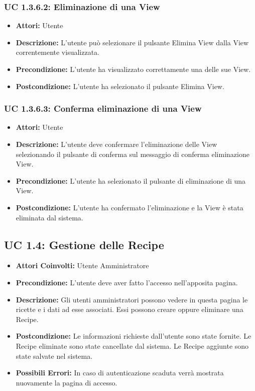 \subsubsection{UC 1.3.6.2: Eliminazione di una View}

\begin{itemize}
\item \textbf{Attori:} Utente
\item \textbf{Descrizione:} L'utente può selezionare il pulsante Elimina View dalla View correntemente visualizzata.
\item \textbf{Precondizione:} L'utente ha visualizzato correttamente una delle sue View.
\item \textbf{Postcondizione:} L'utente ha selezionato il pulsante Elimina View.
\end{itemize}

\subsubsection{UC 1.3.6.3: Conferma eliminazione di una View}

\begin{itemize}
\item \textbf{Attori:} Utente
\item \textbf{Descrizione:} L'utente deve confermare l'eliminazione delle View selezionando il pulsante di conferma sul messaggio di conferma eliminazione View.
\item \textbf{Precondizione:} L'utente ha selezionato il pulsante di eliminazione di una View.
\item \textbf{Postcondizione:} L'utente ha confermato l'eliminazione e la View è stata eliminata dal sistema.
\end{itemize}




\subsection{UC 1.4: Gestione delle Recipe}

\begin{itemize}
\item \textbf{Attori Coinvolti:} Utente Amministratore

\item \textbf{Precondizione:} L'utente deve aver fatto l'accesso nell'apposita pagina.

\item \textbf{Descrizione:} Gli utenti amministratori possono vedere in questa pagina le ricette e i dati ad esse associati. Essi possono creare oppure eliminare una Recipe.

\item \textbf{Postcondizione:} Le informazioni richieste dall'utente sono state fornite.
Le Recipe eliminate sono state cancellate dal sistema.
Le Recipe aggiunte sono state salvate nel sistema.

\item \textbf{Possibili Errori:} In caso di autenticazione scaduta verrà mostrata nuovamente la pagina di accesso.
\end{itemize}

